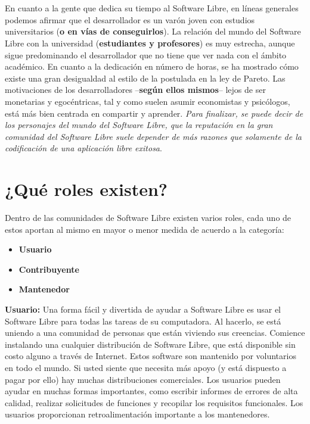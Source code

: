 \\
\\
En cuanto a la gente que dedica su tiempo al Software Libre, en líneas generales podemos afirmar que el desarrollador es un varón joven con estudios universitarios ({\bf o en vías de conseguirlos}). La relación del mundo del Software Libre con la universidad ({\bf estudiantes y profesores}) es muy estrecha, aunque sigue predominando el desarrollador que no tiene que ver nada con el ámbito académico. En cuanto a la dedicación en número de horas, se ha mostrado cómo existe una gran desigualdad al estilo de la postulada en la ley de Pareto. 
Las motivaciones de los desarrolladores –{\bf según ellos mismos}– lejos de ser monetarias y egocéntricas, tal y como suelen asumir economistas y psicólogos, está más bien centrada en compartir y aprender. \emph{Para finalizar, se puede decir de los personajes del mundo del Software Libre, que la reputación en la gran comunidad del Software Libre suele depender de más razones que solamente de la codificación de una aplicación libre exitosa}.

\section{¿Qué roles existen?}

Dentro de las comunidades de Software Libre existen varios roles, cada uno de estos aportan al mismo en mayor o menor medida de acuerdo a la categoría:
\begin{itemize}
     \item \textbf{Usuario}
     \item \textbf{Contribuyente}
     \item \textbf{Mantenedor}
\end{itemize}

\textbf{Usuario:} Una forma fácil y divertida de ayudar a Software Libre es usar el Software Libre para todas las tareas de su computadora. Al hacerlo, se está uniendo a una comunidad de personas que están viviendo sus creencias. Comience instalando una cualquier distribución de Software Libre, que está disponible sin costo alguno a través de Internet. Estos software son mantenido por voluntarios en todo el mundo. Si usted siente que necesita más apoyo (y está dispuesto a pagar por ello) hay muchas distribuciones comerciales. Los usuarios pueden ayudar en muchas formas importantes, como escribir informes de errores de alta calidad, realizar solicitudes de funciones y recopilar los requisitos funcionales. Los usuarios proporcionan retroalimentación importante a los mantenedores.

